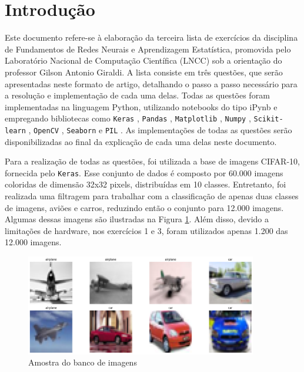 \documentclass[]{abntex2}
\begin{document}
\frenchspacing 

\maketitle

\section*{\textbf{Introdução}}

Este documento refere-se à elaboração da terceira lista de exercícios da disciplina de Fundamentos de Redes Neurais e Aprendizagem Estatística, promovida pelo Laboratório Nacional de Computação Científica (LNCC) sob a orientação do professor Gilson Antonio Giraldi. A lista consiste em três questões, que serão apresentadas neste formato de artigo, detalhando o passo a passo necessário para a resolução e implementação de cada uma delas. Todas as questões foram implementadas na linguagem Python, utilizando notebooks do tipo iPynb e empregando bibliotecas como \texttt{Keras} \cite{keras}, \texttt{Pandas} \cite{pandas}, \texttt{Matplotlib} \cite{matplotlib}, \texttt{Numpy} \cite{numpy}, \texttt{Scikit-learn} \cite{scikit-learn}, \texttt{OpenCV} \cite{opencv}, \texttt{Seaborn} \cite{seaborn} e \texttt{PIL} \cite{pillow}. As implementações de todas as questões serão disponibilizadas ao final da explicação de cada uma delas neste documento.

Para a realização de todas as questões, foi utilizada a base de imagens CIFAR-10, fornecida pelo \texttt{Keras}. Esse conjunto de dados é composto por 60.000 imagens coloridas de dimensão 32x32 pixels, distribuídas em 10 classes. Entretanto, foi realizada uma filtragem para trabalhar com a classificação de apenas duas classes de imagens, aviões e carros, reduzindo então o conjunto para 12.000 imagens. Algumas dessas imagens são ilustradas na Figura \ref{fig:amostra}. Além disso, devido a limitações de hardware, nos exercícios 1 e 3, foram utilizados apenas 1.200 das 12.000 imagens.

\begin{figure}[H]
    \centering 
    \includegraphics[width=0.9\textwidth]{imgs/introduction/amostra.png}
    \caption{Amostra do banco de imagens}
    \label{fig:amostra} %
\end{figure}
\end{document}
